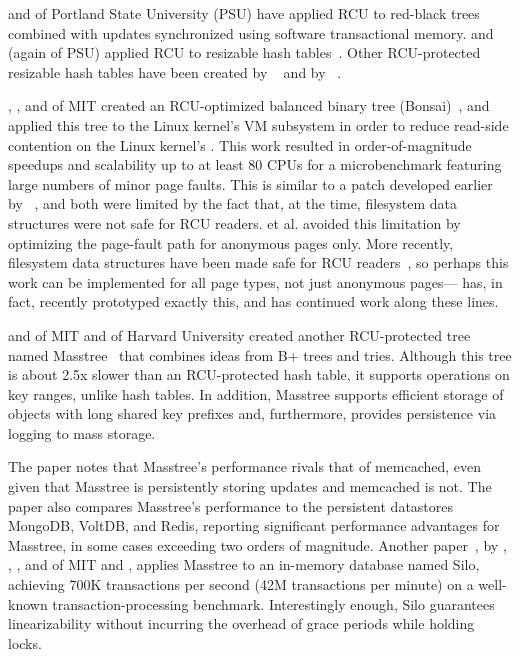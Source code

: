  and  of Portland State University
(PSU) have
applied RCU to red-black
trees~\cite{PhilHowardPhD,PhilHoward2011RCUTMRBTree} combined with updates
synchronized using software transactional memory.
 and  (again of PSU)
applied RCU to resizable
hash tables~\cite{JoshTriplettPhD,Triplett:2011:RPHash,JonCorbet2014RCUhash1,JonCorbet2014RCUhash2}.
Other RCU-protected resizable hash tables have been created by
~\cite{HerbertXu2010RCUResizeHash} and by
~\cite{PaulMcKenney2013LWNURCUhash}.

, , and 
of MIT created an RCU-optimized balanced binary tree
(Bonsai)~\cite{AustinClements2012RCULinux:mmapsem}, and applied this
tree to the Linux kernel's VM subsystem in order to reduce read-side
contention on the Linux kernel's .
This work resulted in order-of-magnitude speedups and scalability up to
at least 80 CPUs for a microbenchmark featuring large numbers of minor
page faults.
This is similar to a patch developed earlier by
~\cite{PeterZijlstra2014SpeculativePageFault}, and both
were limited by the fact that, at the time, filesystem data structures
were not safe for RCU readers.
 et al. avoided this limitation by
optimizing the page-fault
path for anonymous pages only.
More recently, filesystem data structures have been made safe for RCU
readers~\cite{JonathanCorbet2010dcacheRCU,JonathanCorbet2011dcacheRCUbug},
so perhaps this work can be implemented for all page types, not just
anonymous pages--- has, in fact, recently prototyped
exactly this, and  has continued work along these lines.

 and  of MIT and  of
Harvard University created another RCU-protected tree named
Masstree~\cite{Mao:2012:CCF:2168836.2168855} that combines ideas from B+
trees and tries.
Although this tree is about 2.5x slower than an RCU-protected hash table,
it supports operations on key ranges, unlike hash tables.
In addition, Masstree supports efficient storage of objects with long
shared key prefixes and, furthermore, provides persistence via logging
to mass storage.

The paper notes that Masstree's performance rivals that of memcached, even
given that Masstree is persistently storing updates and memcached is not.
The paper also compares Masstree's performance to the persistent
datastores MongoDB, VoltDB, and Redis, reporting significant performance
advantages for Masstree, in some cases exceeding two orders of magnitude.
Another paper~\cite{Tu:2013:STM:2517349.2522713}, by ,
, , and 
of MIT and ,
applies Masstree to an in-memory database named Silo, achieving 700K
transactions per second (42M transactions per minute) on a well-known
transaction-processing benchmark.
Interestingly enough, Silo guarantees linearizability without incurring
the overhead of grace periods while holding locks.

